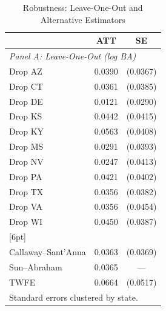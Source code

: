 \begin{table}[htbp]
\centering
\caption{Robustness: Leave-One-Out and Alternative Estimators}
\label{tab:robust}
\begin{tabular}{lcc}
\hline\hline
 & ATT & SE \\
\hline
\multicolumn{3}{l}{\textit{Panel A: Leave-One-Out (log BA)}} \\
Drop AZ & 0.0390 & (0.0367) \\
Drop CT & 0.0361 & (0.0385) \\
Drop DE & 0.0121 & (0.0290) \\
Drop KS & 0.0442 & (0.0415) \\
Drop KY & 0.0563 & (0.0408) \\
Drop MS & 0.0291 & (0.0393) \\
Drop NV & 0.0247 & (0.0413) \\
Drop PA & 0.0421 & (0.0402) \\
Drop TX & 0.0356 & (0.0382) \\
Drop VA & 0.0356 & (0.0454) \\
Drop WI & 0.0450 & (0.0387) \\
{}[6pt]
\multicolumn{3}{l}{\textit{Panel B: Alternative Estimators (log WBA)}} \\
Callaway--Sant'Anna & 0.0363 & (0.0369) \\
Sun--Abraham & 0.0365 & --- \\
TWFE & 0.0664 & (0.0517) \\
\hline\hline
\multicolumn{3}{l}{\footnotesize Standard errors clustered by state.} \\
\end{tabular}
\end{table}

